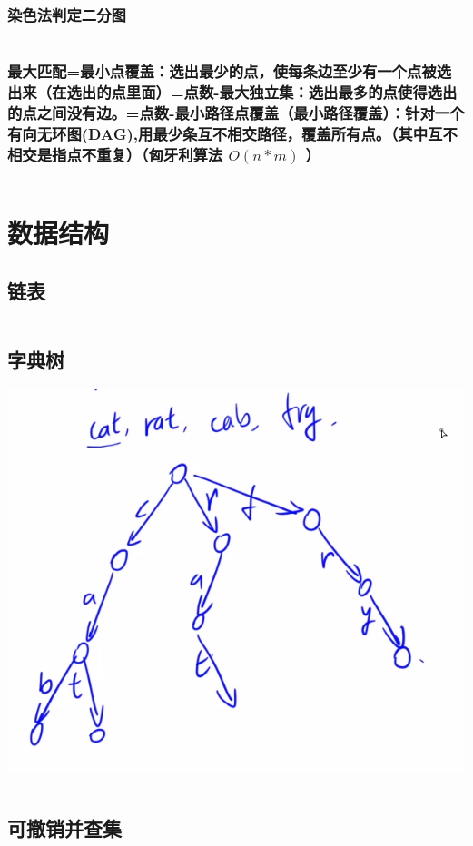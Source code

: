 \documentclass[a4paper,11pt]{article}
\begin{document}
\subsubsection{染色法判定二分图}
\inputminted[breaklines]{c++}{图论/染色法.cpp}
\subsubsection{最大匹配=最小点覆盖：选出最少的点，使每条边至少有一个点被选出来（在选出的点里面）=点数-最大独立集：选出最多的点使得选出的点之间没有边。=点数-最小路径点覆盖（最小路径覆盖）：针对一个有向无环图(DAG),用最少条互不相交路径，覆盖所有点。（其中互不相交是指点不重复）（匈牙利算法 $O(n*m)$ ）}
\inputminted[breaklines]{c++}{图论/匈牙利算法.cpp}

\newpage
\section{数据结构} %
\subsection{链表} %
\inputminted[breaklines]{c++}{数据结构/链表.cpp}
\subsection{字典树} %
\includegraphics[scale=0.6]{数据结构/trie.png}
\inputminted[breaklines]{c++}{数据结构/字典树.cpp}
\subsection{可撤销并查集} %
\inputminted[breaklines]{c++}{数据结构/可撤销并查集.cpp}
\end{document}
